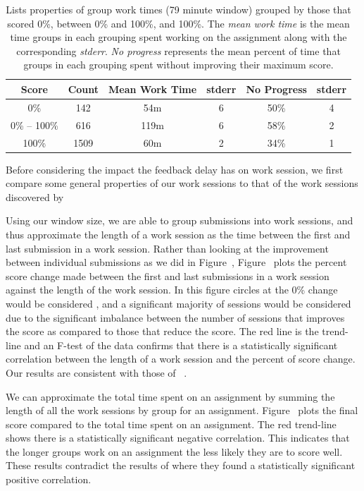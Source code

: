 \begin{table}
\centering
\begin{tabular}{|c||c|c|c|c|c|} \hline
Score & Count & Mean Work Time & stderr & No Progress & stderr \\ \hline \hline
0\% & 142 & 54m & 6 & 50\% & 4 \\ \hline
0\% -- 100\% & 616 & 119m & 6 & 58\% & 2 \\ \hline
100\% & 1509 & 60m & 2 & 34\% & 1 \\ \hline
\end{tabular}
\caption{Lists properties of group work times (79 minute window) grouped by
  those that scored 0\%, between 0\% and 100\%, and 100\%. The \emph{mean work
    time} is the mean time groups in each grouping spent working on the
  assignment along with the corresponding \emph{stderr}. \emph{No progress}
  represents the mean percent of time that groups in each grouping spent
  without improving their maximum score.}
\end{table}

Before considering the impact the feedback delay has on work session, we first
compare some general properties of our work sessions to that of the work
sessions discovered by \spacco{}

Using our window size, we are able to group submissions into work sessions, and
thus approximate the length of a work session as the time between the first and
last submission in a work session. Rather than looking at the improvement
between individual submissions as we did in
Figure~, Figure~
plots the percent score change made between the first and last submissions in a
work session against the length of the work session. In this figure circles at
the 0\% change would be considered \noi{}, and a significant majority of
sessions would be considered \imp{} due to the significant imbalance between
the number of sessions that improves the score as compared to those that reduce
the score. The red line is the trend-line and an F-test of the data confirms
that there is a statistically significant correlation between the length of a
work session and the percent of score change. Our results are consistent with
those of \spacco{}~\cite{Spacco:2013:TIP:2462476.2465594}.

We can approximate the total time spent on an assignment by summing the length
of all the work sessions by group for an
assignment. Figure~ plots the final score compared to
the total time spent on an assignment. The red trend-line shows there is a
statistically significant negative correlation. This indicates that the longer
groups work on an assignment the less likely they are to score well. These
results contradict the results of \spacco{} where they found a statistically
significant positive correlation.

